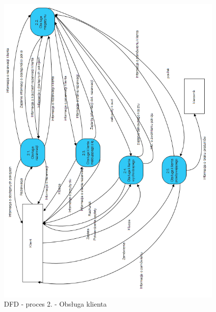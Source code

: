 \documentclass[a4paper, 11pt]{article}
\begin{document}
	\begin{figure}[H]%
			\center
			\includegraphics[scale=1.0]{Img/2.png}
			\caption{DFD - proces 2. - Obsługa klienta}
	\end{figure}
\end{document}
